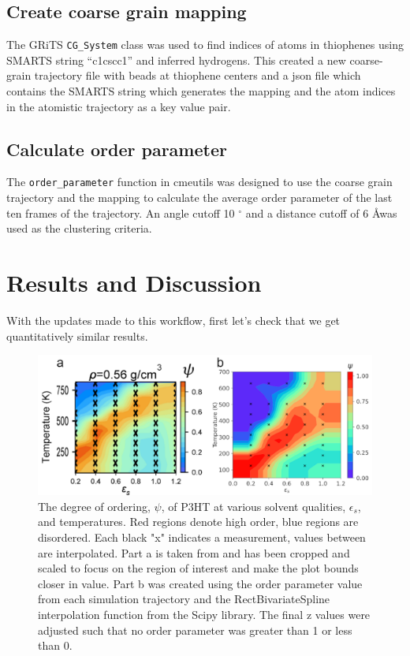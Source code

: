 \subsection{Create coarse grain mapping}
The GRiTS \lstinline{CG_System} class was used to find indices of atoms in thiophenes using SMARTS string ``c1cscc1'' and inferred hydrogens. This created a new coarse-grain trajectory file with beads at thiophene centers and a json file which contains the SMARTS string which generates the mapping and the atom indices in the atomistic trajectory as a key value pair.

\subsection{Calculate order parameter}
The \lstinline{order_parameter} function in cmeutils was designed to use the coarse grain trajectory and the mapping to calculate the average order parameter of the last ten frames of the trajectory. An angle cutoff 10 $^{\circ}$ and a distance cutoff of 6 \AA was used as the clustering criteria.

\section{Results and Discussion}

With the updates made to this workflow, first let's check that we get quantitatively similar results.

\begin{figure}
    \centering
    \includegraphics[width=0.8\linewidth]{figures/p3ht_val/Miller2018_fig3comparison.png}
    \caption{The degree of ordering, $\psi$, of P3HT at various solvent qualities, $\epsilon_{s}$, and temperatures. Red regions denote high order, blue regions are disordered. Each black "x" indicates a measurement, values between are interpolated. Part a is taken from \citet[Figure 3a]{Miller2018} and has been cropped and scaled to focus on the region of interest and make the plot bounds closer in value. Part b was created using the order parameter value from each simulation trajectory and the RectBivariateSpline interpolation function from the Scipy library. The final z values were adjusted such that no order parameter was greater than 1 or less than 0.}\label{fig:order}
\end{figure}

